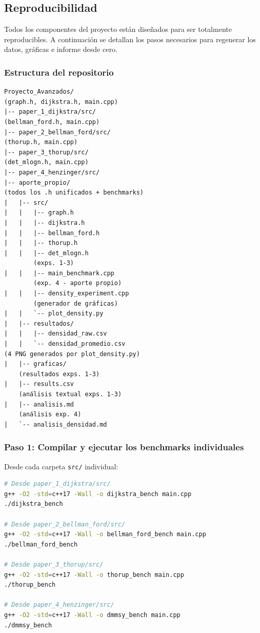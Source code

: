 
\subsection{Reproducibilidad}

Todos los componentes del proyecto están diseñados para ser totalmente
reproducibles. A continuación se detallan los pasos necesarios para regenerar
los datos, gráficas e informe desde cero.

\subsubsection*{Estructura del repositorio}

\begin{verbatim}
Proyecto_Avanzados/
(graph.h, dijkstra.h, main.cpp)
|-- paper_1_dijkstra/src/
(bellman_ford.h, main.cpp)
|-- paper_2_bellman_ford/src/
(thorup.h, main.cpp)
|-- paper_3_thorup/src/
(det_mlogn.h, main.cpp)
|-- paper_4_henzinger/src/
|-- aporte_propio/
(todos los .h unificados + benchmarks)
|   |-- src/
|   |   |-- graph.h
|   |   |-- dijkstra.h
|   |   |-- bellman_ford.h
|   |   |-- thorup.h
|   |   |-- det_mlogn.h
        (exps. 1-3)
|   |   |-- main_benchmark.cpp
        (exp. 4 - aporte propio)
|   |   |-- density_experiment.cpp
        (generador de gráficas)
|   |   `-- plot_density.py
|   |-- resultados/
|   |   |-- densidad_raw.csv
|   |   `-- densidad_promedio.csv
(4 PNG generados por plot_density.py)
|   |-- graficas/
    (resultados exps. 1-3)
|   |-- results.csv
    (análisis textual exps. 1-3)
|   |-- analisis.md
    (análisis exp. 4)
|   `-- analisis_densidad.md
\end{verbatim}

\subsubsection*{Paso 1: Compilar y ejecutar los benchmarks individuales}

Desde cada carpeta \texttt{src/} individual:

\begin{lstlisting}[language=bash, caption={Compilación individual de cada algoritmo.}, captionpos=b]
# Desde paper_1_dijkstra/src/
g++ -O2 -std=c++17 -Wall -o dijkstra_bench main.cpp
./dijkstra_bench

# Desde paper_2_bellman_ford/src/
g++ -O2 -std=c++17 -Wall -o bellman_ford_bench main.cpp
./bellman_ford_bench

# Desde paper_3_thorup/src/
g++ -O2 -std=c++17 -Wall -o thorup_bench main.cpp
./thorup_bench

# Desde paper_4_henzinger/src/
g++ -O2 -std=c++17 -Wall -o dmmsy_bench main.cpp
./dmmsy_bench
\end{lstlisting}

